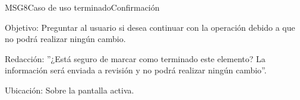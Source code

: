 \begin{mensaje}{MSG8}{Caso de uso terminado}{Confirmación}
	\item [Objetivo:] Preguntar al usuario si desea continuar con la operación debido a que no podrá realizar ningún cambio.
	\item[Redacción:] ''¿Está seguro de marcar como terminado este elemento? La información será enviada a revisión y no podrá realizar ningún cambio''.
	\item [Ubicación:] Sobre la pantalla activa.
\end{mensaje}
